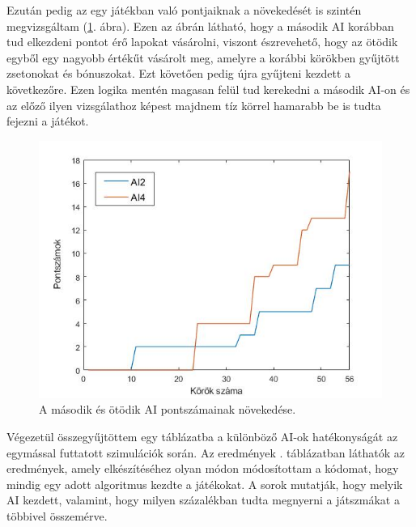 Ezután pedig az egy játékban való pontjaiknak a növekedését is szintén megvizsgáltam (\ref{fig:player_scores2v5}. ábra). Ezen az ábrán látható, hogy a második AI korábban tud elkezdeni pontot érő lapokat vásárolni, viszont észrevehető, hogy az ötödik egyből egy nagyobb értékűt vásárolt meg, amelyre a korábbi körökben gyűjtött zsetonokat és bónuszokat. Ezt követően pedig újra gyűjteni kezdett a következőre. Ezen logika mentén magasan felül tud kerekedni a második AI-on és az előző ilyen vizsgálathoz képest majdnem tíz körrel hamarabb be is tudta fejezni a játékot.

\begin{figure}[h]
\centering
\includegraphics[scale=0.6]{images/player_points_AI2vsAI5.jpg}
\caption{A második és ötödik AI pontszámainak növekedése.}
\label{fig:player_scores2v5}
\end{figure}




Végezetül összegyűjtöttem egy táblázatba a különböző AI-ok hatékonyságát az egymással futtatott szimulációk során. Az eredmények . táblázatban láthatók az eredmények, amely elkészítéséhez olyan módon módosítottam a kódomat, hogy mindig egy adott algoritmus kezdte a játékokat. A sorok mutatják, hogy melyik AI kezdett, valamint, hogy milyen százalékban tudta megnyerni a játszmákat a többivel összemérve.


